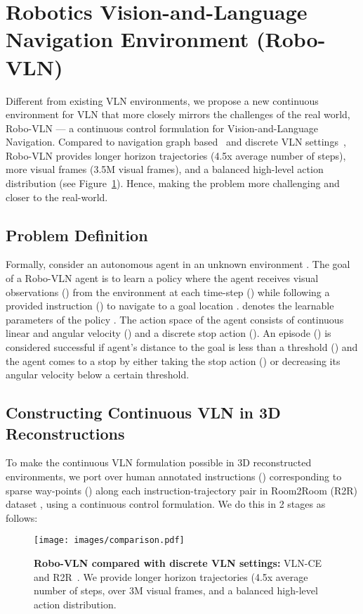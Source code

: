 \documentclass[letter, 10pt, conference]{ieeeconf}
\begin{document}
\section{Robotics Vision-and-Language Navigation Environment (Robo-VLN)}\label{robo-vln}

Different from existing VLN environments, we propose a new continuous environment for VLN that more closely mirrors the challenges of the real world, Robo-VLN --- a continuous control formulation for Vision-and-Language Navigation. 
Compared to navigation graph based~\cite{mattersim} and discrete VLN settings~\cite{krantz2020navgraph}, Robo-VLN provides longer horizon trajectories (4.5x average number of steps), more visual frames (3.5M visual frames), and a balanced high-level action distribution (see Figure~\ref{comparison_discrete}). Hence, making the problem more challenging and closer to the real-world.

\subsection{Problem Definition}
Formally, consider an autonomous agent  in an unknown environment . 
The goal of a Robo-VLN agent is to learn a policy  where the agent receives visual observations () from the environment  at each time-step () while following a provided instruction () to navigate to a goal location . 
 denotes the learnable parameters of the policy . 
The action space of the agent consists of continuous linear and angular velocity () and a discrete stop action (). 
An episode () is considered successful if agent's distance to the goal is less than a threshold () and the agent comes to a stop by either taking the stop action () or decreasing its angular velocity below a certain threshold.

\subsection{Constructing Continuous VLN in 3D Reconstructions}
To make the continuous VLN formulation possible in 3D reconstructed environments, we port over human annotated instructions () corresponding to sparse way-points () along each instruction-trajectory pair in Room2Room (R2R) dataset \cite{mattersim}, using a continuous control formulation. We do this in 2 stages as follows: 

\begin{figure}[t!]
\centering
\texttt{[image: images/comparison.pdf]}
\centering
  \caption{
  \textbf{Robo-VLN compared with discrete VLN settings:} VLN-CE~\cite{krantz2020navgraph} and R2R~\cite{mattersim}.
  We provide longer horizon trajectories (4.5x average number of steps, over 3M visual frames, and a balanced high-level action distribution.
  }
  \label{comparison_discrete}
\end{figure}
\end{document}
